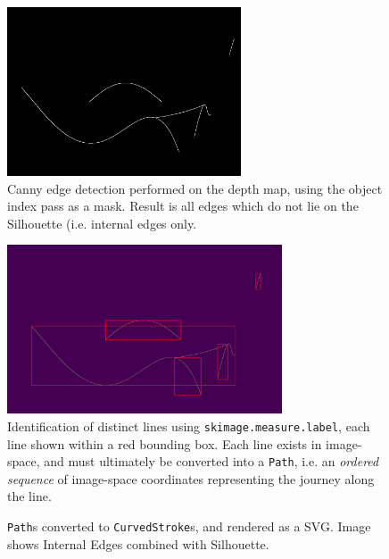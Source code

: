 \begin{figure}[h!]
	\centering
	\includegraphics[height=5cm]{images/int_edge.png}
	\caption{Canny edge detection performed on the depth map, using the object index pass as a mask. Result is all edges which do not lie on the Silhouette (i.e. internal edges only.}\label{int_edge}
\end{figure}

\begin{figure}[h!]
	\centering
	\includegraphics[height=5cm]{images/int_labels.png}
	\caption{Identification of distinct lines using \texttt{skimage.measure.label}, each line shown within a red bounding box. Each line exists in image-space, and must ultimately be converted into a \texttt{Path}, i.e. an \emph{ordered sequence} of image-space coordinates representing the journey along the line.}\label{int_labels}
\end{figure}

\begin{figure}[h!]
	\centering
	
	\caption{\texttt{Path}s converted to \texttt{CurvedStroke}s, and rendered as a SVG. Image shows Internal Edges combined with Silhouette.}\label{int}
\end{figure}

\newpage
\FloatBarrier
